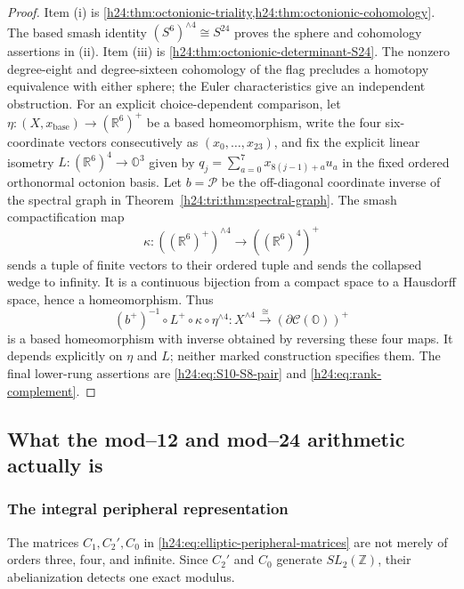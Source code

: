 \begin{proof}
Item (i) is \cref{h24:thm:octonionic-triality,h24:thm:octonionic-cohomology}.
The based smash identity
\((S^6)^{\wedge4}\cong S^{24}\) proves the sphere and cohomology assertions
in (ii).  Item (iii) is
\cref{h24:thm:octonionic-determinant-S24}.  The nonzero degree-eight and
degree-sixteen cohomology of the flag precludes a homotopy equivalence with
either sphere; the Euler characteristics give an independent obstruction.
For an explicit choice-dependent comparison, let
\(\eta:(X,x_{\mathrm{base}})\to(\mathbb R^6)^+\) be a based homeomorphism,
write the four six-coordinate vectors consecutively as
$(x_0,\ldots,x_{23})$, and fix the explicit linear isometry
$L:(\mathbb R^6)^4\to\mathbb O^3$ given by
$q_j=\sum_{a=0}^7x_{8(j-1)+a}u_a$ in the fixed ordered orthonormal
octonion basis. Let $b=\mathcal P$ be the off-diagonal coordinate inverse
of the spectral graph in Theorem~\ref{h24:tri:thm:spectral-graph}.
The smash compactification map
\[
 \kappa:((\mathbb R^6)^+)^{\wedge4}\longrightarrow((\mathbb R^6)^4)^+
\]
sends a tuple of finite vectors to their ordered tuple and sends the
collapsed wedge to infinity.  It is a continuous bijection from a compact
space to a Hausdorff space, hence a homeomorphism.  Thus
\[
 (b^+)^{-1}\circ L^+\circ\kappa\circ\eta^{\wedge4}:
 X^{\wedge4}\xrightarrow{\ \cong\ }
       (\partial\mathcal C(\mathbb O))^+
\]
is a based homeomorphism with inverse obtained by reversing these four
maps.  It depends explicitly on \(\eta\) and \(L\); neither marked
construction specifies them.  The final
lower-rung assertions are \eqref{h24:eq:S10-S8-pair} and
\eqref{h24:eq:rank-complement}.
\end{proof}

\subsection{What the mod--12 and mod--24 arithmetic actually is}
\label{h24:sec:mod-12-24}

\subsubsection{The integral peripheral representation}

The matrices \(C_1,C_2',C_0\) in
\eqref{h24:eq:elliptic-peripheral-matrices} are not merely of orders three,
four, and infinite.  Since \(C_2'\) and \(C_0\) generate
\(SL_2(\mathbb Z)\), their abelianization detects one exact modulus.

